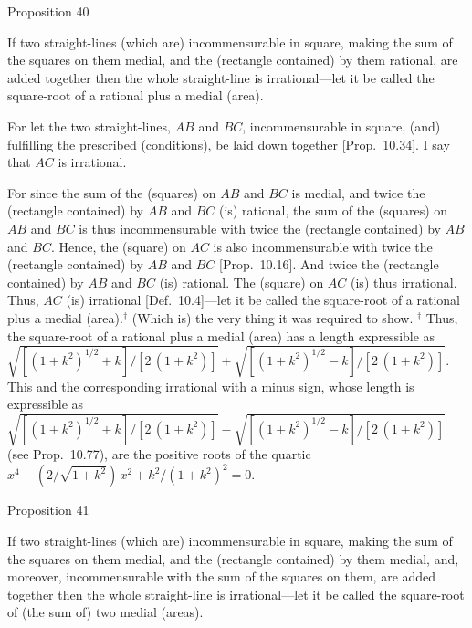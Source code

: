
\begin{center}
{\large Proposition 40}
\end{center}

If two straight-lines (which are) incommensurable
in square, making the sum of the squares on them medial, 
and the (rectangle contained) by them rational, are added together then the whole straight-line
is irrational---let it be called the square-root of a rational plus a medial (area).

\epsfysize=0.3in
\centerline{}

For let the two straight-lines, $AB$ and $BC$, incommensurable
in square, (and) fulfilling the prescribed (conditions), be laid down together [Prop.~10.34]. I say that $AC$ is irrational.

For since the sum of the (squares) on $AB$ and $BC$ is medial,
and twice the (rectangle contained) by $AB$ and $BC$ (is) rational, 
the sum of the (squares) on $AB$ and $BC$ is thus incommensurable
with twice the (rectangle contained) by $AB$ and $BC$. Hence, the (square)
on $AC$ is also incommensurable with twice the (rectangle contained)
by $AB$ and $BC$ [Prop.~10.16]. And twice the
(rectangle contained) by $AB$ and $BC$ (is) rational. The (square) on
$AC$ (is) thus irrational. Thus, $AC$ (is) irrational [Def.~10.4]---let it be called
the square-root of a rational plus a medial (area).$^\dag$
(Which is) the very thing it
was required to show.
{\footnotesize\noindent$^\dag$ Thus, the square-root
of a rational plus a medial (area)
has a length expressible as $\sqrt{[(1+k^2)^{1/2}+k]/[2\,(1+k^2)]} +\sqrt{[(1+k^2)^{1/2}-k]/[2\,(1+k^2)]}$. This  and the corresponding irrational with a minus sign, whose length is expressible as $\sqrt{[(1+k^2)^{1/2}+k]/[2\,(1+k^2)]} -\sqrt{[(1+k^2)^{1/2}-k]/[2\,(1+k^2)]}$
 (see Prop.~10.77), are the positive roots of the quartic $x^4-(2/\sqrt{1+k^2})\,x^2+ k^2/(1+k^2)^2 = 0$.} 
 

\begin{center}
{\large Proposition 41}
\end{center}

If two straight-lines (which are) incommensurable
in square, making the sum of the squares
on them medial, and the (rectangle contained) by them medial, and,
moreover, incommensurable with the sum of the squares on them, are added together then
the whole straight-line is irrational---let it be called the square-root
of (the sum of) two medial (areas).


